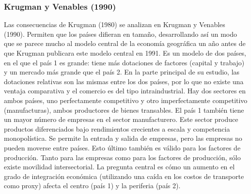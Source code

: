 \subsubsection{Krugman y Venables (1990)}
Las consecuencias de Krugman (1980) se analizan en Krugman y Venables (1990). Permiten que los países difieran en tamaño, desarrollando así un modo que se parece mucho al modelo central de la economía geográfica un año antes de que Krugman publicara este modelo central en 1991. Es un modelo de dos países, en el que el país 1 es grande: tiene más dotaciones de factores (capital y trabajo) y un mercado más grande que el país 2. En la parte principal de su estudio, las dotaciones relativas son las mismas entre los dos países, por lo que no existe una ventaja comparativa y el comercio es del tipo intraindustrial. Hay dos sectores en ambos países, uno perfectamente competitivo y otro imperfectamente competitivo (manufacturas), ambos productores de bienes transables. El país 1 también tiene un mayor número de empresas en el sector manufacturero. Este sector produce productos diferenciados bajo rendimientos crecientes a escala y competencia monopolística. Se permite la entrada y salida de empresas, pero las empresas no pueden moverse entre países. Esto último también es válido para los factores de producción. Tanto para las empresas como para los factores de producción, sólo existe movilidad intersectorial. La pregunta central es cómo un aumento en el grado de integración económica (utilizando una caída en los costos de transporte como proxy) afecta el centro (país 1) y la periferia (país 2).\\
